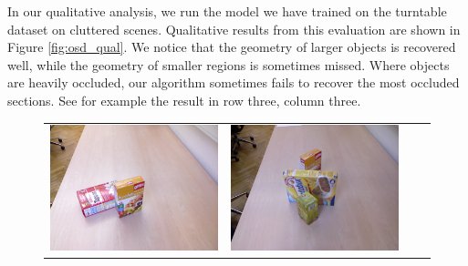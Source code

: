 \documentclass[10pt,twocolumn,letterpaper]{article}
\begin{document}
In our qualitative analysis, we run the model we have trained on the turntable dataset on cluttered scenes.
Qualitative results from this evaluation are shown in Figure \ref{fig:osd_qual}.
We notice that the geometry of larger objects is recovered well, while the geometry of smaller regions is sometimes missed.
Where objects are heavily occluded, our algorithm sometimes fails to recover the most occluded sections.
See for example the result in row three, column three.

\newcommand{\scenewidth}{0.48\columnwidth}
\newcommand{\topc}{30}

\begin{figure}
    \begin{tabular}{cccc}
    \includegraphics[width=\scenewidth]{scene/image_color/learn12} &
    \includegraphics[width=\scenewidth]{scene/image_color/test11} &

\end{tabular}
\end{figure}
\end{document}
